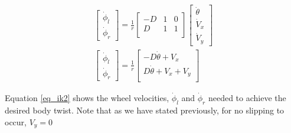 \documentclass{article}
\begin{document}
\begin{gather}
   \label{eq_ik}
    \begin{bmatrix} \dot \phi_l \\ \dot \phi_r \end{bmatrix}
        =
        \frac{1}{r}
        \begin{bmatrix}
            -D & 1 & 0 \\
            D & 1 & 1 \\
        \end{bmatrix}
         \begin{bmatrix} \dot \theta \\ \dot V_x \\ \dot V_y \end{bmatrix}
        \\[10pt]
   \label{eq_ik2}
    \begin{bmatrix} \dot \phi_l \\ \dot \phi_r \end{bmatrix}
        =
        \frac{1}{r}
        \begin{bmatrix}
            -D \dot \theta + V_x  \\
            D \dot \theta + V_x + V_y \\
        \end{bmatrix}
\end{gather}

\noindent
Equation \ref{eq_ik2} shows the wheel velocities, $\dot \phi_l$ and $\dot \phi_r$
needed to achieve the desired body twist. Note that as we have stated
previously, for no slipping to occur, $V_y = 0$
\end{document}
